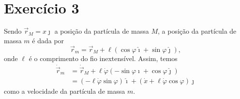 \section*{Exercício 3}
Sendo \(\vec{r}_M = x\hat{\jmath}\) a posição da partícula de massa \(M\), a posição da partícula de massa \(m\) é dada por
\begin{equation*}
    \vec{r}_m = \vec{r}_M + \ell \left(\cos\varphi \hat\imath + \sin\varphi \hat\jmath\right),
\end{equation*}
onde \(\ell\) é o comprimento do fio inextensível. Assim, temos
\begin{align*}
    \dot{\vec{r}}_m &= \dot{\vec{r}}_M + \ell \dot\varphi(-\sin\varphi\hat\imath + \cos\varphi\hat\jmath)\\
                    &= \left(-\ell\dot\varphi\sin\varphi\right)\hat\imath + \left(\dot{x} + \ell\dot\varphi\cos\varphi\right)\hat\jmath
\end{align*}
como a velocidade da partícula de massa \(m\).
